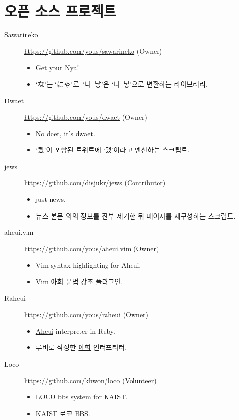 \documentclass[a4paper,10pt]{article}
\begin{document}
\section{오픈 소스 프로젝트}
\begin{description}
  \item[Sawarineko] \url{https://github.com/yous/sawarineko} (Owner)
    \begin{itemize}
      \item Get your Nya!
      \item `な'는 `にゃ'로, `나--낳'은 `냐--냫'으로 변환하는 라이브러리.
    \end{itemize}
  \item[Dwaet] \url{https://github.com/yous/dwaet} (Owner)
    \begin{itemize}
      \item No doet, it's dwaet.
      \item `됬'이 포함된 트위트에 `됐'이라고 멘션하는 스크립트.
    \end{itemize}
  \item[jews] \url{https://github.com/disjukr/jews} (Contributor)
    \begin{itemize}
      \item just news.
      \item 뉴스 본문 외의 정보를 전부 제거한 뒤 페이지를 재구성하는 스크립트.
    \end{itemize}
  \item[aheui.vim] \url{https://github.com/yous/aheui.vim} (Owner)
    \begin{itemize}
      \item Vim syntax highlighting for Aheui.
      \item Vim 아희 문법 강조 플러그인.
    \end{itemize}
  \item[Raheui] \url{https://github.com/yous/raheui} (Owner)
    \begin{itemize}
      \item \href{http://aheui.github.io}{Aheui} interpreter in Ruby.
      \item 루비로 작성한 \href{http://aheui.github.io}{아희} 인터프리터.
    \end{itemize}
  \item[Loco] \url{https://github.com/khwon/loco} (Volunteer)
    \begin{itemize}
      \item LOCO bbs system for KAIST.
      \item KAIST 로코 BBS.

\end{itemize}
\end{description}
\end{document}
